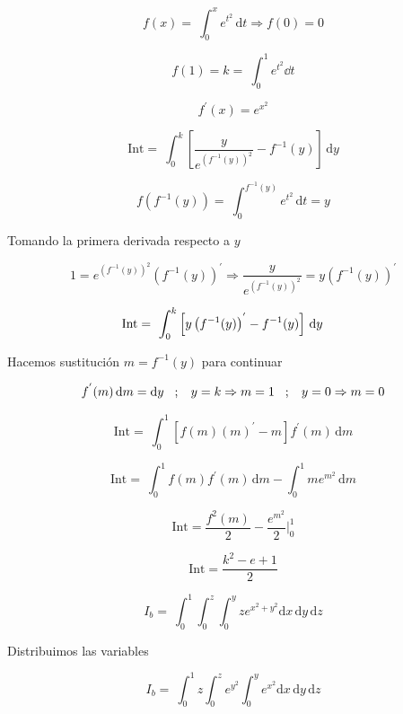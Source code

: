 {%

$$
f(x)=\ \int_{0}^{ x } e^{t^2} \, \mathrm{d}t \Rightarrow f(0)=0
$$

$$
f(1)=k=\ \int_{0}^{ 1 } e^{t^2}\dd{t}
$$

$$
f^{'}(x)=e^{x^2} 
$$



$$ 
\mathrm{Int}= \ \int_{0}^{ k } \left[ \frac{y}{e^{(f^{-1} (y))^2}} -f^{-1} (y) \right]\, \mathrm{d} y   
$$

$$
f(f^{-1} (y))=\ \int_{0}^{ f^{-1} (y) } e^{t^2} \, \mathrm{d}t =y
$$

Tomando la primera derivada respecto a $y$

$$
1=e^{(f^{-1} (y))^2} \left(f^{-1} (y) \right)^{'}  
\Rightarrow \frac{y}{e^{(f^{-1} (y))^2}} =y \left(f^{-1} (y) \right)^{'}
$$

$$
\mathrm{Int}= \ \int_{0}^{ k } \left[ y \left(f^{-1} (y) \right)^{'} -f^{-1} (y) \right]\, \mathrm{d} y  \hspace{.3 cm}  \hspace{.3 cm} 
$$

Hacemos sustitución $ m=f^{-1} (y)$ para continuar

$$
f^{'} (m) \, \mathrm{d} m= \mathrm{d}y \hspace{.3 cm};  \hspace{.3 cm} y=k \Rightarrow m=1 \hspace{.3 cm};  \hspace{.3 cm} y=0 \Rightarrow m=0
$$

$$
\mathrm{Int}= \ \int_{0}^{ 1 } \left[ f(m) \left(m \right)^{'} -m \right] f^{'} (m) \, \mathrm{d} m
$$

$$
\mathrm{Int}= \ \int_{0}^{ 1 }  f(m) f^{'} (m) \, \mathrm{d} m -\int_{0}^{ 1 } m e^{m^2} \, \mathrm{d} m 
$$

$$
\mathrm{Int}= \frac{f^2 (m)}{2} -\frac{e^{m^2}}{2} \bigg\rvert_0^1 
$$

\begin{LnxRptaBox}
$$ 
\mathrm{Int}= \frac{k^2 -e+1}{2}
$$
\end{LnxRptaBox}

 
$$
I_b= \ \int_{0}^{ 1 } \int_{0}^{ z } \int_{0}^{ y }  ze^{x^2+y^2}  \mathrm{d} x \,  \mathrm{d} y \,  \mathrm{d} z 
$$

Distribuimos las variables  

$$
I_b= \ \int_{0}^{ 1 } z \int_{0}^{ z } e^{y^2} \int_{0}^{ y }  e^{x^2}  \mathrm{d} x \,  \mathrm{d} y \, \mathrm{d} z     
$$

}
